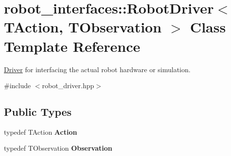 \hypertarget{classrobot__interfaces_1_1RobotDriver}{}\section{robot\+\_\+interfaces\+:\+:Robot\+Driver$<$ T\+Action, T\+Observation $>$ Class Template Reference}
\label{classrobot__interfaces_1_1RobotDriver}


\hyperlink{classDriver}{Driver} for interfacing the actual robot hardware or simulation.  




{\ttfamily \#include $<$robot\+\_\+driver.\+hpp$>$}

\subsection*{Public Types}
\begin{DoxyCompactItemize}
\item 
typedef T\+Action {\bfseries Action}\hypertarget{classrobot__interfaces_1_1RobotDriver_acbba637e7857bef5c7a1e64c9846ead7}{}\label{classrobot__interfaces_1_1RobotDriver_acbba637e7857bef5c7a1e64c9846ead7}

\item 
typedef T\+Observation {\bfseries Observation}\hypertarget{classrobot__interfaces_1_1RobotDriver_abcb094711d0ae09fd8e2fc9a6aa771f2}{}\label{classrobot__interfaces_1_1RobotDriver_abcb094711d0ae09fd8e2fc9a6aa771f2}

\end{DoxyCompactItemize}
